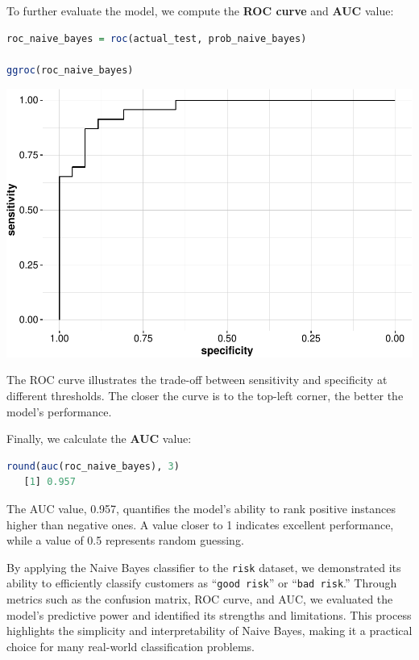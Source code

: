 \documentclass[
]{book}
\newcommand{\passthrough}[1]{#1}
\theoremstyle{definition}
\theoremstyle{definition}
\theoremstyle{definition}
\theoremstyle{definition}
\theoremstyle{remark}
\begin{document}
To further evaluate the model, we compute the \textbf{ROC curve} and \textbf{AUC} value:

\begin{lstlisting}[language=R]
roc_naive_bayes = roc(actual_test, prob_naive_bayes)

ggroc(roc_naive_bayes)
\end{lstlisting}

\begin{center}\includegraphics[width=0.7\linewidth]{bayes_files/figure-latex/unnamed-chunk-17-1} \end{center}

The ROC curve illustrates the trade-off between sensitivity and specificity at different thresholds. The closer the curve is to the top-left corner, the better the model's performance.

Finally, we calculate the \textbf{AUC} value:

\begin{lstlisting}[language=R]
round(auc(roc_naive_bayes), 3)
   [1] 0.957
\end{lstlisting}

The AUC value, 0.957, quantifies the model's ability to rank positive instances higher than negative ones. A value closer to 1 indicates excellent performance, while a value of 0.5 represents random guessing.

By applying the Naive Bayes classifier to the \passthrough{\lstinline!risk!} dataset, we demonstrated its ability to efficiently classify customers as ``\passthrough{\lstinline!good risk!}'' or ``\passthrough{\lstinline!bad risk!}.'' Through metrics such as the confusion matrix, ROC curve, and AUC, we evaluated the model's predictive power and identified its strengths and limitations. This process highlights the simplicity and interpretability of Naive Bayes, making it a practical choice for many real-world classification problems.
\end{document}
